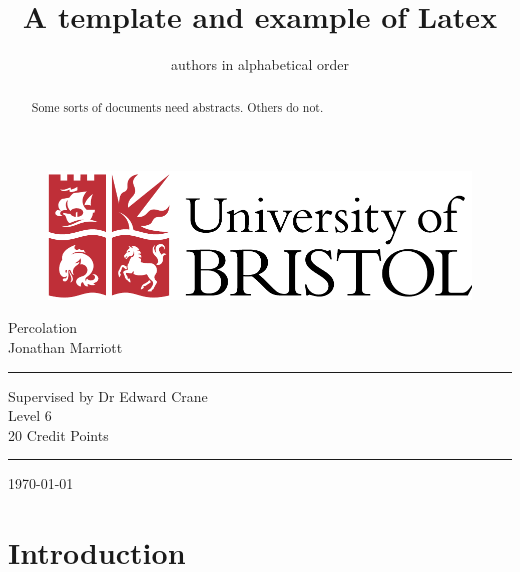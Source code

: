 \documentclass[a4paper,11pt]{article}
\theoremstyle{definition}
\begin{document}
\thispagestyle{empty}

\begin{figure}[h]
\begin{center}
\includegraphics[scale=0.5]{uob.pdf} %
\end{center}
\end{figure}

\begin{center}
{\Large Percolation\\ \vspace{1cm}Jonathan Marriott}
\end{center}

\vspace{3cm}
\hrule
\begin{center}
Supervised by Dr Edward Crane\\
Level 6\\
20 Credit Points
\end{center}
\hrule

\vspace{3cm}
\begin{center}
\today
\end{center}
	
\title{A template and example of Latex}
\author{authors in alphabetical order}
\date{}
\maketitle

\begin{abstract}
Some sorts of documents need abstracts. Others do not.
\end{abstract}


\section{Introduction}
\end{document}
